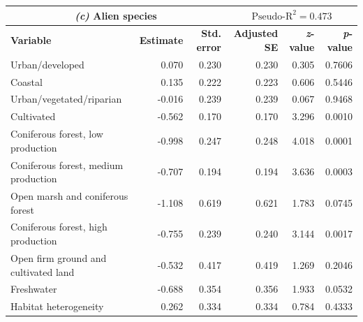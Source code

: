 \documentclass{article}
\begin{document}
\begin{table}[h]
\begin{tabular}{l r r r r r}
    \multicolumn{3}{c}{\textbf{\textit{(c)}  Alien species}} & \multicolumn{3}{c}{$\text{Pseudo-R}^2 = 0.473$} \\
    \hline
    \textbf{Variable} & \textbf{Estimate} & \textbf{Std. error} & \textbf{Adjusted SE} & \textbf{\textit{z}-value} & \textbf{\textit{p}-value} \\
    \hline
    Urban/developed                         & 0.070    & 0.230     & 0.230       & 0.305    & 0.7606    \\
    Coastal                                 & 0.135    & 0.222     & 0.223       & 0.606    & 0.5446    \\
    Urban/vegetated/riparian                & -0.016   & 0.239     & 0.239       & 0.067    & 0.9468    \\
    Cultivated                              & -0.562   & 0.170     & 0.170       & 3.296    & 0.0010    \\
    Coniferous forest, low production       & -0.998   & 0.247     & 0.248       & 4.018    & 0.0001    \\
    Coniferous forest, medium production    & -0.707   & 0.194     & 0.194       & 3.636    & 0.0003    \\
    Open marsh and coniferous forest        & -1.108   & 0.619     & 0.621       & 1.783    & 0.0745    \\
    Coniferous forest, high production      & -0.755   & 0.239     & 0.240       & 3.144    & 0.0017    \\
    Open firm ground and cultivated land    & -0.532   & 0.417     & 0.419       & 1.269    & 0.2046    \\
    Freshwater                              & -0.688   & 0.354     & 0.356       & 1.933    & 0.0532    \\
    Habitat heterogeneity                   & 0.262    & 0.334     & 0.334       & 0.784    & 0.4333    \\
    \hline
    \end{tabular}
\end{table}
\end{document}
